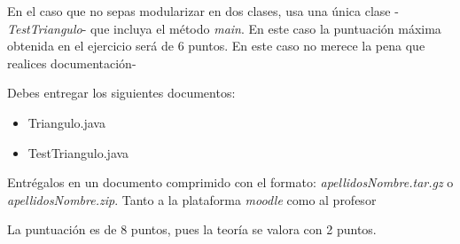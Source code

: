 \documentclass[addpoints,12pt]{exam}
\begin{document}
\begin{questions}
En el caso que no sepas modularizar en dos clases, usa una única clase -\emph{TestTriangulo}- que incluya el método \emph{main}. En este caso la puntuación máxima obtenida en el ejercicio será de 6 puntos. En este caso no merece la pena que realices documentación-
\end{questions}

\vspace{0,5cm}
Debes entregar los siguientes documentos:
\begin{itemize}
\item Triangulo.java
\item TestTriangulo.java
\end{itemize}

Entrégalos en un documento comprimido con el formato:\emph{ apellidosNombre.tar.gz} o \emph{apellidosNombre.zip}. Tanto a la plataforma \emph{moodle} como al profesor\par
\vspace{0.5cm}
La puntuación es de 8 puntos, pues la teoría se valora con 2 puntos.
\end{document}
